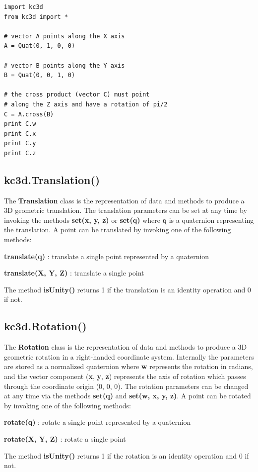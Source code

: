 \begin{verbatim}
import kc3d
from kc3d import *

# vector A points along the X axis
A = Quat(0, 1, 0, 0)

# vector B points along the Y axis
B = Quat(0, 0, 1, 0)

# the cross product (vector C) must point
# along the Z axis and have a rotation of pi/2
C = A.cross(B)
print C.w
print C.x
print C.y
print C.z
\end{verbatim}

\subsection{kc3d.Translation()}
The \textbf{Translation} class is the representation of data and methods to
produce a 3D geometric translation. The translation parameters can be set at any
time by invoking the methods \textbf{set(x, y, z)} or \textbf{set(q)} where \textbf{q}
is a quaternion representing the translation. A point can be
translated by invoking one of the following methods:

\textbf{translate(q)} : translate a single point represented by a quaternion

\textbf{translate(X, Y, Z)} : translate a single point

The method \textbf{isUnity()} returns 1 if the translation is an identity operation and
0 if not.

\subsection{kc3d.Rotation()}
The \textbf{Rotation} class is the representation of data and methods to produce
a 3D geometric rotation in a right-handed coordinate system. Internally the
parameters are stored as a normalized quaternion where \textbf{w} represents the
rotation in radians, and the vector component (\textbf{x}, \textbf{y}, \textbf{z})
represents the axis of rotation which passes through the coordinate origin (0, 0, 0).
The rotation parameters can be changed at any time via the methods \textbf{set(q)}
and \textbf{set(w, x, y, z)}. A point can be rotated by invoking one
of the following methods:

\textbf{rotate(q)} : rotate a single point represented by a quaternion

\textbf{rotate(X, Y, Z)} : rotate a single point

The method \textbf{isUnity()} returns 1 if the rotation is an identity operation and
0 if not.

